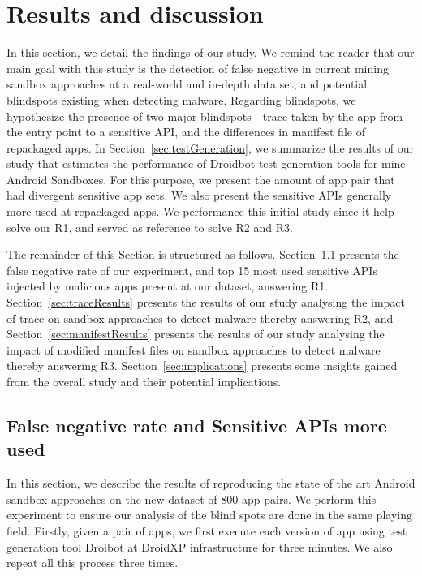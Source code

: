 \section{Results and discussion}\label{sec:results}

In this section, we detail the findings of our study.  We remind the reader that our main goal with this study is the detection of false negative in current mining sandbox approaches at a real-world and in-depth data set, and potential blindspots existing when detecting malware. Regarding blindspots, we hypothesize the presence of two major blindspots - trace taken by the app from the entry point to a sensitive API, and the differences in manifest file of repackaged apps. In Section~\ref{sec:testGeneration}, we summarize the results of our study that estimates the performance of Droidbot test generation tools for mine Android Sandboxes. For this purpose, we present the amount of app pair that had divergent sensitive app sets. We also present the sensitive APIs generally more used at repackaged apps. We performance this initial study since it help solve our R1, and served as reference to solve R2 and R3.

The remainder of this Section is structured as follows. Section~\ref{sec:Sensitive APIs} presents the false negative rate of our experiment, and top 15 most used sensitive APIs injected by malicious apps present at our dataset, answering R1. Section~\ref{sec:traceResults} presents the results of our study analysing the impact of trace on sandbox approaches to detect malware thereby answering R2, and Section~\ref{sec:manifestResults} presents the results of our study analysing the impact of modified manifest files on sandbox approaches to detect malware thereby answering R3. Section~\ref{sec:implications} presents some insights gained from the overall study and their potential implications.

\subsection{False negative rate and Sensitive APIs more used}\label{sec:Sensitive APIs}

In this section, we describe the results of reproducing the state of the art Android sandbox approaches on the new dataset of $800$ app pairs. We perform this experiment to ensure our analysis of the blind spots are done in the same playing field. Firstly, given a pair of apps, we first execute each version of app using test generation tool Droibot at DroidXP infrastructure for three minutes. We also repeat all this process three times.

